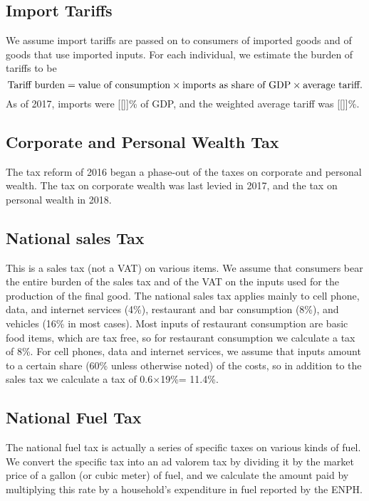 \documentclass[12pt]{article}
\begin{document}
\begin{appendices}
\subsection{Import Tariffs}

We assume import tariffs are passed on to consumers of imported goods
and of goods that use imported inputs.
For each individual, we estimate the burden of tariffs to be
\begin{equation}
  \textnormal{Tariff burden} =
      \textnormal{value of consumption}
      \times \textnormal{imports as share of GDP}
      \times \textnormal{average tariff}.
\end{equation}
As of 2017, imports were [[]]\% of GDP,
and the weighted average tariff was [[]]\%.

\subsection{Corporate and Personal Wealth Tax}
The tax reform of 2016 began a phase-out
of the taxes on corporate and personal wealth.
The tax on corporate wealth was last levied in 2017,
and the tax on personal wealth in 2018.

\subsection{National sales Tax}
This is a sales tax (not a VAT) on various items.
We assume that consumers bear the entire burden of
the sales tax
and of the VAT on the inputs used for the production of the final good.
The national sales tax applies mainly to
cell phone, data, and internet services (4\%),
restaurant and bar consumption (8\%),
and vehicles (16\% in most cases).
Most inputs of restaurant consumption are basic food items,
which are tax free,
so for restaurant consumption we calculate a tax of 8\%.
For cell phones, data and internet services,
we assume that inputs amount to a certain share
(60\% unless otherwise noted) of the costs,
so in addition to the sales tax we calculate a tax of
0.6$\times$19\%= 11.4\%.

\subsection{National Fuel Tax}
The national fuel tax is actually
a series of specific taxes on various kinds of fuel.
We convert the specific tax into an ad valorem tax
by dividing it by the market price of a gallon (or cubic meter) of fuel,
and we calculate the amount paid
by multiplying this rate
by a household's expenditure in fuel reported by the ENPH.


\end{appendices}
\end{document}
